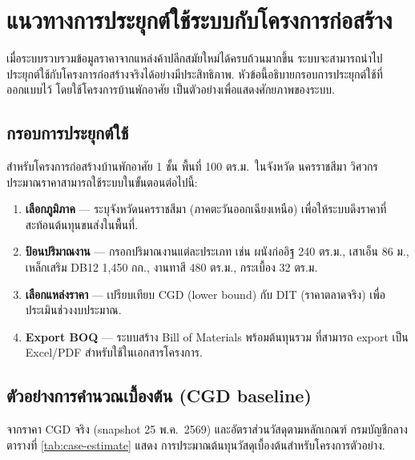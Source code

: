 \section{แนวทางการประยุกต์ใช้ระบบกับโครงการก่อสร้าง}
\label{sec:case-study}

เมื่อระบบรวบรวมข้อมูลราคาจากแหล่งค้าปลีกสมัยใหม่ได้ครบถ้วนมากขึ้น
ระบบจะสามารถนำไปประยุกต์ใช้กับโครงการก่อสร้างจริงได้อย่างมีประสิทธิภาพ.
หัวข้อนี้อธิบายกรอบการประยุกต์ใช้ที่ออกแบบไว้ โดยใช้โครงการบ้านพักอาศัย
เป็นตัวอย่างเพื่อแสดงศักยภาพของระบบ.

\subsection{กรอบการประยุกต์ใช้}

สำหรับโครงการก่อสร้างบ้านพักอาศัย 1 ชั้น พื้นที่ 100 ตร.ม.\ ในจังหวัด
นครราชสีมา วิศวกรประมาณราคาสามารถใช้ระบบในขั้นตอนต่อไปนี้:

\begin{enumerate}[leftmargin=2em]
  \item \textbf{เลือกภูมิภาค} --- ระบุจังหวัดนครราชสีมา (ภาคตะวันออกเฉียงเหนือ)
        เพื่อให้ระบบดึงราคาที่สะท้อนต้นทุนขนส่งในพื้นที่.
  \item \textbf{ป้อนปริมาณงาน} --- กรอกปริมาณงานแต่ละประเภท เช่น
        ผนังก่ออิฐ 240 ตร.ม., เสาเอ็น 86 ม., เหล็กเสริม DB12 1,450 กก.,
        งานทาสี 480 ตร.ม., กระเบื้อง 32 ตร.ม.
  \item \textbf{เลือกแหล่งราคา} --- เปรียบเทียบ CGD (lower bound) กับ DIT
        (ราคาตลาดจริง) เพื่อประเมินช่วงงบประมาณ.
  \item \textbf{Export BOQ} --- ระบบสร้าง Bill of Materials พร้อมต้นทุนรวม
        ที่สามารถ export เป็น Excel/PDF สำหรับใช้ในเอกสารโครงการ.
\end{enumerate}

\subsection{ตัวอย่างการคำนวณเบื้องต้น (CGD baseline)}

จากราคา CGD จริง (snapshot 25 พ.ค.\ 2569) และอัตราส่วนวัสดุตามหลักเกณฑ์
กรมบัญชีกลาง \cite{cgd2569} ตารางที่ \ref{tab:case-estimate} แสดง
การประมาณต้นทุนวัสดุเบื้องต้นสำหรับโครงการตัวอย่าง.

